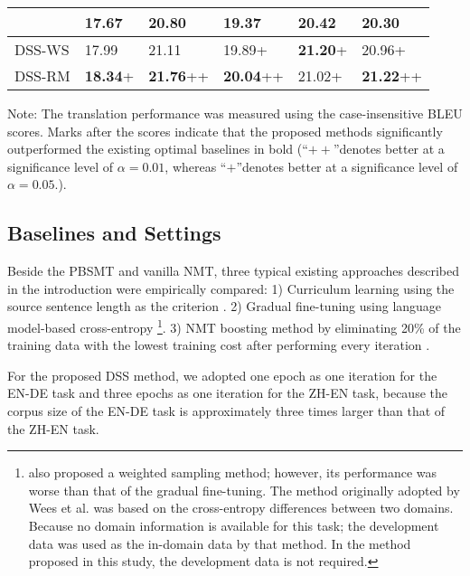 \documentclass[11pt,a4paper]{article}
\begin{document}
\begin{table*}[ht]
\begin{center}
\begin{tabular}{l|l|l|l|l|l}
			\citet{zhang-EtAl:2017:I17-2} &17.67 & 20.80 & \textbf{19.37} &20.42& \textbf{20.30}\\
			\hline
			DSS-WS & 17.99& 21.11 & 19.89+ &\textbf{21.20}+& 20.96+\\
			DSS-RM &  \textbf{18.34}+& \textbf{21.76}++ & \textbf{20.04}++ &21.02+& \textbf{21.22}++\\
			\hline
			\hline
		\end{tabular}
	\end{center}
	\begin{tablenotes}
		\item Note: The translation performance was measured using the case-insensitive BLEU \citep{Papineni:2002:BMA:1073083.1073135} scores. Marks after the scores indicate that the proposed methods significantly \citep{koehn:2004} outperformed the existing optimal baselines in bold (\textquotedblleft $++$\textquotedblright denotes better at a significance  level of $\alpha = 0.01$, whereas \textquotedblleft $+$\textquotedblright denotes better at a significance level of $\alpha = 0.05$.).
	\end{tablenotes}
	
	
\end{table*}

\subsection{Baselines and Settings}
Beside the  PBSMT \citep{koehn-EtAl:2007:PosterDemo} and vanilla NMT, three typical existing approaches described in the introduction were empirically compared: 1)   Curriculum learning using the source sentence length as the criterion \citep{DBLP:journals/corr/KocmiB17aa}. 2)   Gradual fine-tuning using language model-based cross-entropy  \citep{vanderwees-bisazza-monz:2017:EMNLP2017}\footnote{\citet{vanderwees-bisazza-monz:2017:EMNLP2017} also proposed a weighted sampling method; however, its performance was worse than that of the gradual fine-tuning. The method originally adopted by Wees et al. was based on the cross-entropy differences between two domains. Because no domain information is available for this task; the development data was used as the in-domain data by that method. In the method proposed in this study, the development data is not required.}.  3) NMT boosting method by eliminating 20\% of the training data with the lowest training cost after performing every iteration \citep{zhang-EtAl:2017:I17-2}.

For the proposed DSS method, we adopted one epoch as one iteration for the EN-DE task and three epochs as one iteration for the ZH-EN task, because the corpus size of the EN-DE task is approximately three times larger than that of  the ZH-EN task.
\end{document}
